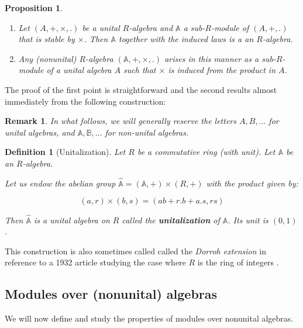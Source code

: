 \documentclass[a4paper,fleqn]{cas-sc}
\newtheorem{prop}[thm]{Proposition}%
\newtheorem{rem}{Remark}%
\newtheorem{dfnt}{Definition}%
\newcommand{\bA}{\mathbb{A}}
\newcommand{\bB}{\mathbb{B}}
\begin{document}
\begin{prop}
\begin{enumerate}
    \item Let $(A, +, \times, .)$ be a unital $R$-algebra and $\bA$ a sub-$R$-module of $(A, +, .)$ that is stable by $\times$.
    Then $\bA$ together with the induced laws is a an $R$-algebra.
    \item Any (nonunital) $R$-algebra $(\bA, +, \times, .)$ arises in this manner as a sub-$R$-module of a unital algebra $A$ such that $\times$ is induced from the product in $A$.
\end{enumerate}
\end{prop}


The proof of the first point is straightforward and the second results almost immediately from the following construction:

\begin{rem}
\label{rem:not}
In what follows, we will generally reserve the letters $A, B, \ldots$ for unital algebras, and $\bA, \bB,\ldots$ for non-unital algebras.
\end{rem}

\begin{dfnt}[Unitalization]
\label{def:algunitalization}
Let $R$ be a commutative ring (with unit).
Let $\bA$ be an $R$-algebra.

Let us endow the abelian group $\widehat{\bA} = (\bA,+) \times (R,+)$ with the product given by:

$$(a,r)\times (b,s) = (ab + r.b + a.s, rs)$$

Then $\widehat{\bA}$ is a unital algebra on $R$ called the \textbf{unitalization} of $\bA$.
Its unit is $(0,1)$.
\end{dfnt}

This construction is also sometimes called called the \textit{Dorroh extension} in reference to a 1932 article studying the case where $R$ is the ring of integers \cite{Dorr}.

\subsection{Modules over (nonunital) algebras}

We will now define and study the properties of modules over nonunital algebras. %
\end{document}
